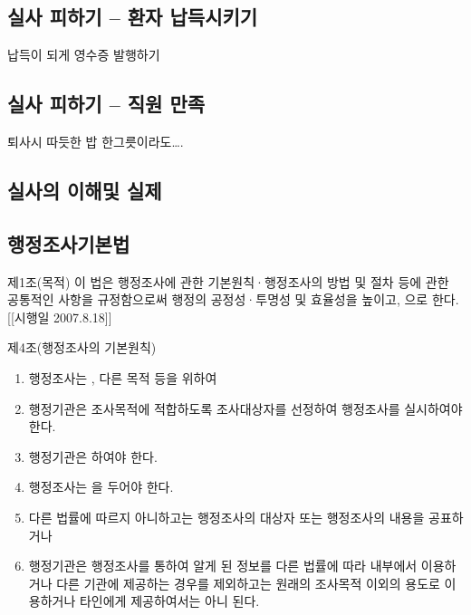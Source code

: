\subsection{실사 피하기 – 환자 납득시키기}
납득이 되게 영수증 발행하기
\subsection{실사 피하기 – 직원 만족}
퇴사시 따듯한 밥 한그릇이라도….

\subsection{실사의 이해및 실제}
\subsection{행정조사기본법}
제1조(목적)
이 법은 행정조사에 관한 기본원칙·행정조사의 방법 및 절차 등에 관한 공통적인 사항을 규정함으로써 행정의 공정성·투명성 및 효율성을 높이고, 으로 한다.
[[시행일 2007.8.18]]

제4조(행정조사의 기본원칙)
\begin{enumerate}[①]\tightlist
\item 행정조사는 , 다른 목적 등을 위하여 
\item 행정기관은 조사목적에 적합하도록 조사대상자를 선정하여 행정조사를 실시하여야 한다.
\item 행정기관은   하여야 한다.
\item 행정조사는  을 두어야 한다.
\item 다른 법률에 따르지 아니하고는 행정조사의 대상자 또는 행정조사의 내용을 공표하거나 
\item 행정기관은 행정조사를 통하여 알게 된 정보를 다른 법률에 따라 내부에서 이용하거나 다른 기관에 제공하는 경우를 제외하고는 원래의 조사목적 이외의 용도로 이용하거나 타인에게 제공하여서는 아니 된다.
\end{enumerate}

